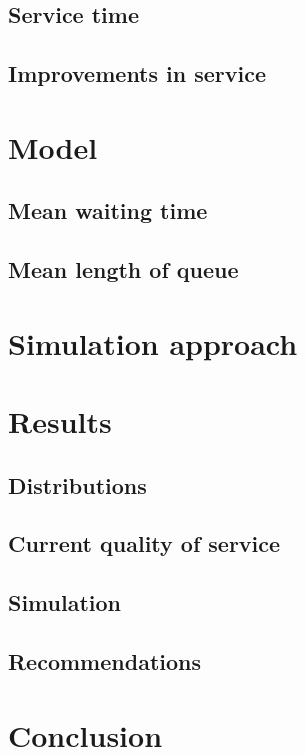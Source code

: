 \documentclass[11pt]{article}
\begin{document}
\subsection{Service time}

\subsection{Improvements in service}
\section{Model}
\subsection{Mean waiting time}
\subsection{Mean length of queue}
\section{Simulation approach}
\section{Results}
\subsection{Distributions}
\subsection{Current quality of service}
\subsection{Simulation}
\subsection{Recommendations}
\section{Conclusion}



\end{document}
